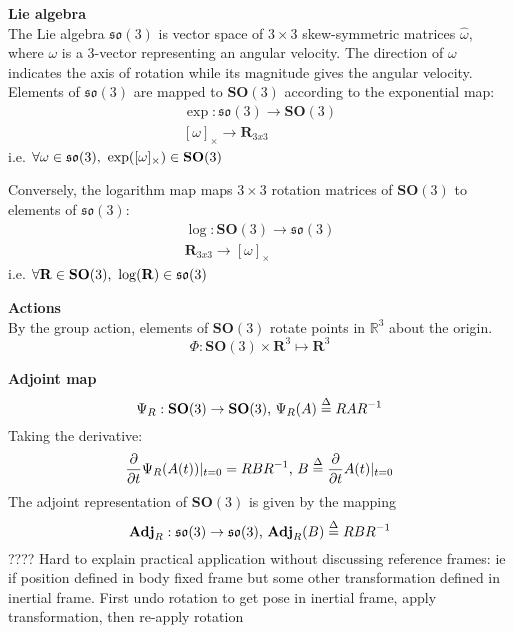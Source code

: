 		\textbf{Lie algebra}\\
		The Lie algebra $\mathfrak{so}(3)$ is vector space of $3 \times 3$ skew-symmetric matrices $\hat{\omega}$, where $\omega$ is a 3-vector representing an angular velocity. The direction of $\omega$ indicates the axis of rotation while its magnitude gives the angular velocity. 
		Elements of $\mathfrak{so}(3)$ are mapped to $\textbf{SO}(3)$ according to the exponential map:
		\begin{equation}
			\begin{split}
				\exp: \mathfrak{so}(3) \rightarrow \mathbf{SO}(3)\\
				[\omega]_\times \rightarrow \mathbf{R}_{3x3}
			\end{split}		
		\end{equation}		
		i.e. $\forall \omega \in \mathfrak{so}(3) \textnormal{, } \exp([\omega]_\times) \in  \mathbf{SO}(3)$
		
		Conversely, the logarithm map maps $3 \times 3$ rotation matrices of $\mathbf{SO}(3)$ to elements of $\mathfrak{so}(3)$:
		\begin{equation}
			\begin{split}
				\log: \mathbf{SO}(3) \rightarrow \mathfrak{so}(3)\\
				 \mathbf{R}_{3x3} \rightarrow [\omega]_\times
			\end{split}		
		\end{equation}		
		i.e. $\forall \mathbf{R} \in \mathbf{SO}(3)  \textnormal{, } \log(\mathbf{R}) \in  \mathfrak{so}(3)$
				
		\textbf{Actions}\\
		By the group action, elements of $\mathbf{SO}(3)$ rotate points in $\mathbb{R}^3$ about the origin. 
		\begin{equation}
			\Phi: \mathbf{SO}(3) \times \mathbf{R}^3 \mapsto \mathbf{R}^3
		\end{equation}
		
		\textbf{Adjoint map}
		\begin{equation}
			\Psi_R: \mathbf{SO}(3) \rightarrow \mathbf{SO}(3) \textnormal{, }
			\Psi_R(A) \stackrel{\Delta}{=} RAR^{-1}
		\end{equation}
		Taking the derivative:
		\begin{equation}
			\frac{\partial}{\partial t} \Psi_R(A(t))|_{t=0} = RBR^{-1} \textnormal{, }
			B \stackrel{\Delta}{=} 	\frac{\partial}{\partial t}A(t)|_{t=0}
		\end{equation}
		The adjoint	representation of $\mathbf{SO}(3)$ is given by the mapping
		\begin{equation}
			\textbf{Adj}_R: \mathfrak{so}(3) \rightarrow \mathfrak{so}(3) \textnormal{, }
			\textbf{Adj}_R(B) \stackrel{\Delta}{=} RBR^{-1}
		\end{equation}
		???? Hard to explain practical application without discussing reference frames: ie if position defined in body fixed frame but some other transformation defined in inertial frame. First undo rotation to get pose in inertial frame, apply transformation, then re-apply rotation
		
